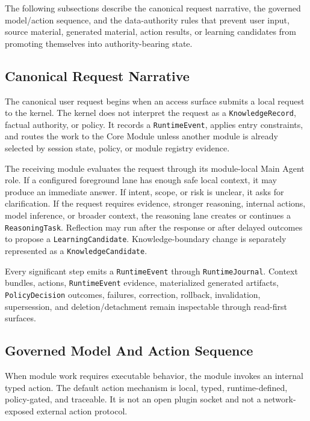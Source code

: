 \documentclass[11pt]{report}
\begin{document}
The following subsections describe the canonical request narrative, the governed model/action sequence, and the data-authority rules that prevent user input, source material, generated material, action results, or learning candidates from promoting themselves into authority-bearing state.

\subsection{Canonical Request Narrative}

The canonical user request begins when an access surface submits a local request to the kernel. The kernel does not interpret the request as a \texttt{KnowledgeRecord}, factual authority, or policy. It records a \texttt{RuntimeEvent}, applies entry constraints, and routes the work to the Core Module unless another module is already selected by session state, policy, or module registry evidence.

The receiving module evaluates the request through its module-local Main Agent role. If a configured foreground lane has enough safe local context, it may produce an immediate answer. If intent, scope, or risk is unclear, it asks for clarification. If the request requires evidence, stronger reasoning, internal actions, model inference, or broader context, the reasoning lane creates or continues a \texttt{ReasoningTask}. Reflection may run after the response or after delayed outcomes to propose a \texttt{LearningCandidate}. Knowledge-boundary change is separately represented as a \texttt{KnowledgeCandidate}.

Every significant step emits a \texttt{RuntimeEvent} through \texttt{RuntimeJournal}. Context bundles, actions, \texttt{RuntimeEvent} evidence, materialized generated artifacts, \texttt{PolicyDecision} outcomes, failures, correction, rollback, invalidation, supersession, and deletion/detachment remain inspectable through read-first surfaces.

\subsection{Governed Model And Action Sequence}

When module work requires executable behavior, the module invokes an internal typed action. The default action mechanism is local, typed, runtime-defined, policy-gated, and traceable. It is not an open plugin socket and not a network-exposed external action protocol.
\end{document}
